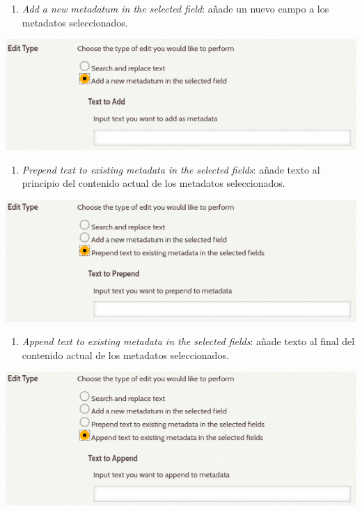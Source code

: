 \documentclass[
]{article}
\providecommand{\tightlist}{%
  \setlength{\itemsep}{0pt}\setlength{\parskip}{0pt}}
\begin{document}
\begin{enumerate}
  \begin{enumerate}
  \def\labelenumii{\alph{enumii}.}
  \setcounter{enumii}{1}
  \tightlist
  \item
    \emph{Add a new metadatum in the selected field}: añade un nuevo
    campo a los metadatos seleccionados.
  \end{enumerate}

  \includegraphics{../_static/images/be-3-2.png}

  \begin{enumerate}
  \def\labelenumii{\alph{enumii}.}
  \setcounter{enumii}{2}
  \tightlist
  \item
    \emph{Prepend text to existing metadata in the selected fields}:
    añade texto al principio del contenido actual de los metadatos
    seleccionados.
  \end{enumerate}

  \includegraphics{../_static/images/be-3-3.png}

  \begin{enumerate}
  \def\labelenumii{\alph{enumii}.}
  \setcounter{enumii}{3}
  \tightlist
  \item
    \emph{Append text to existing metadata in the selected fields}:
    añade texto al final del contenido actual de los metadatos
    seleccionados.
  \end{enumerate}

  \includegraphics{../_static/images/be-3-4.png}


\end{enumerate}
\end{document}

